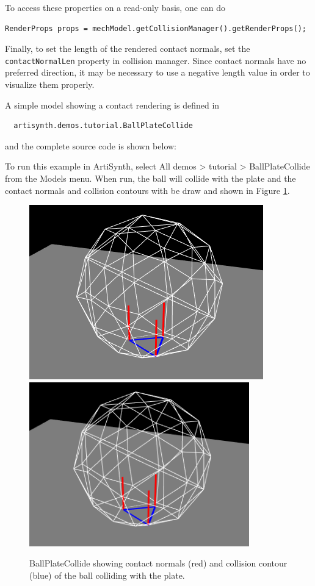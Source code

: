 To access these properties on a read-only basis, one can do
  
\begin{lstlisting}[]
  RenderProps props = mechModel.getCollisionManager().getRenderProps();
\end{lstlisting}

Finally, to set the length of the rendered contact normals, set the
{\tt contactNormalLen} property in collision manager. Since contact
normals have no preferred direction, it may be necessary to use a
negative length value in order to visualize them properly.

A simple model showing a contact rendering is defined in
%
\begin{verbatim}
  artisynth.demos.tutorial.BallPlateCollide
\end{verbatim}
%
and the complete source code is shown below:
%
\lstset{numbers=left}

\lstset{numbers=none}

To run this example in ArtiSynth, select {\sf All demos > tutorial >
BallPlateCollide} from the {\sf Models} menu. When run, the ball
will collide with the plate and the contact normals and collision 
contours with be draw and shown in Figure \ref{BallPlateCollide:fig}.

\begin{figure}[ht]
\begin{center}
\iflatexml
 \includegraphics[]{images/BallPlateCollide}
\else
 \includegraphics[width=3.75in]{images/BallPlateCollide}
\fi
\end{center}
\caption{BallPlateCollide showing contact normals (red) and collision contour
(blue) of the ball colliding with the plate.}
\label{BallPlateCollide:fig}
\end{figure}

